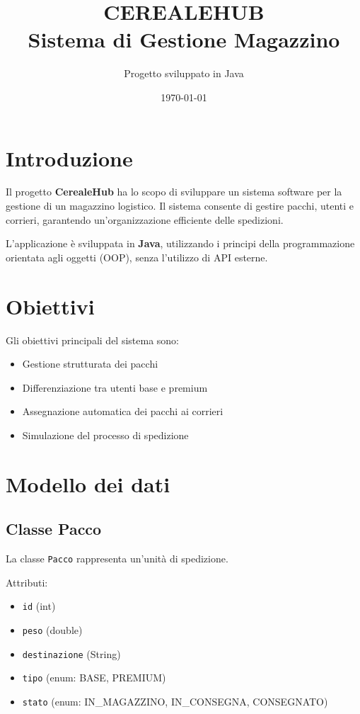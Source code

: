 \documentclass[a4paper,12pt]{article}
\title{CEREALEHUB \\ Sistema di Gestione Magazzino}
\author{Progetto sviluppato in Java}
\date{\today}
\begin{document}
\maketitle

\section{Introduzione}
Il progetto \textbf{CerealeHub} ha lo scopo di sviluppare un sistema software per la gestione di un magazzino logistico. 
Il sistema consente di gestire pacchi, utenti e corrieri, garantendo un'organizzazione efficiente delle spedizioni.

L'applicazione è sviluppata in \textbf{Java}, utilizzando i principi della programmazione orientata agli oggetti (OOP), 
senza l'utilizzo di API esterne.

\section{Obiettivi}
Gli obiettivi principali del sistema sono:
\begin{itemize}
    \item Gestione strutturata dei pacchi
    \item Differenziazione tra utenti base e premium
    \item Assegnazione automatica dei pacchi ai corrieri
    \item Simulazione del processo di spedizione
\end{itemize}

\section{Modello dei dati}

\subsection{Classe Pacco}
La classe \texttt{Pacco} rappresenta un'unità di spedizione.

Attributi:
\begin{itemize}
    \item \texttt{id} (int)
    \item \texttt{peso} (double)
    \item \texttt{destinazione} (String)
    \item \texttt{tipo} (enum: BASE, PREMIUM)
    \item \texttt{stato} (enum: IN\_MAGAZZINO, IN\_CONSEGNA, CONSEGNATO)
\end{itemize}
\end{document}
